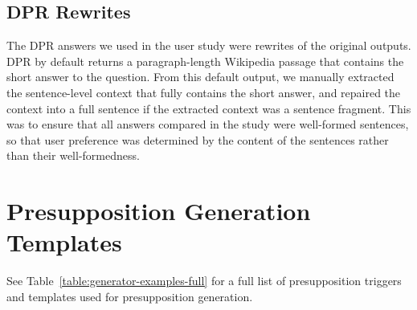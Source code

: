\documentclass[11pt,a4paper]{article}
\begin{document}
\subsection{DPR Rewrites}
\label{app:dpr-rewrite}
The DPR answers we used in the user study were rewrites of the original outputs. DPR by default returns a paragraph-length Wikipedia passage that contains the short answer to the question. From this default output, we manually extracted the sentence-level context that fully contains the short answer, and repaired the context into a full sentence if the extracted context was a sentence fragment. This was to ensure that all answers compared in the study were well-formed sentences, so that user preference was determined by the content of the sentences rather than their well-formedness.


\section{Presupposition Generation Templates}
\label{app:generator-template}

See Table~\ref{table:generator-examples-full} for a full list of presupposition triggers and templates used for presupposition generation.
\end{document}
